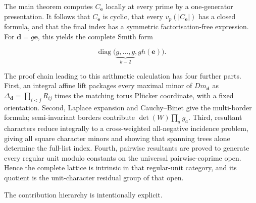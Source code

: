 \documentclass[
  11pt,
  a4paper,
]{article}
\begin{document}
The main theorem computes \(C_{\mathbf e}\) locally at every prime by a
one-generator presentation. It follows that \(C_{\mathbf e}\) is cyclic,
that every \(v_p(|C_{\mathbf e}|)\) has a closed formula, and that the
final index has a symmetric factorisation-free expression. For
\(\mathbf d=g\mathbf e\), this yields the complete Smith form

\[
 \operatorname{diag}
 \bigl(\underbrace{g,\ldots,g}_{k-2},g h(\mathbf e)\bigr).
\]

The proof chain leading to this arithmetic calculation has four further
parts. First, an integral affine lift packages every maximal minor of
\(Dm_{\mathbf d}\) as \(\Delta_{\mathbf d}=\prod_{i<j}R_{ij}\) times the
matching torus Plücker coordinate, with a fixed orientation. Second,
Laplace expansion and Cauchy--Binet give the multi-border formula;
semi-invariant borders contribute \(\det(W)\prod_ag_a\). Third,
resultant characters reduce integrally to a cross-weighted all-negative
incidence problem, giving all square character minors and showing that
spanning trees alone determine the full-list index. Fourth, pairwise
resultants are proved to generate every regular unit modulo constants on
the universal pairwise-coprime open. Hence the complete lattice is
intrinsic in that regular-unit category, and its quotient is the
unit-character residual group of that open.

The contribution hierarchy is intentionally explicit.
\end{document}
